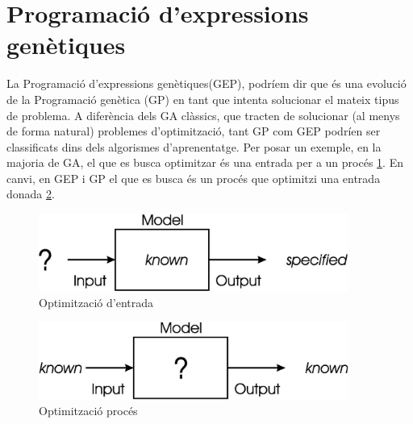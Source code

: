 

\section{Programació d'expressions genètiques} %
\label{sec:Programacio d'expressions genetiques}

La Programació d'expressions genètiques(GEP), podríem dir que és una evolució de
la Programació genètica (GP) en tant que intenta solucionar el mateix tipus de
problema.  A diferència dels GA clàssics, que tracten de solucionar (al menys de
forma natural) problemes d'optimització, tant GP com GEP podríen ser
classificats dins dels algorismes d'aprenentatge.  Per posar un exemple, en la
majoria de GA, el que es busca optimitzar és una entrada per a un procés
\ref{fig:ch1-4}.  En canvi, en GEP i GP el que es busca és un procés que
optimitzi una entrada donada \ref{fig:ch1-5}.

\begin{figure} \centering \includegraphics[width=4in]{intro/1-4.jpg}
\caption{\label{fig:ch1-4}Optimització d'entrada}
\end{figure}
\begin{figure} \centering \includegraphics[width=4in]{intro/1-5.jpg}
\caption{\label{fig:ch1-5}Optimització procés}
\end{figure}

